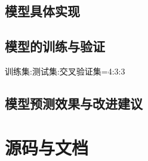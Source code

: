 \documentclass[a4paper,11pt]{ctexart}
\begin{document}
\newpage
\subsection{模型具体实现}

\newpage
\subsection{模型的训练与验证}
训练集:测试集:交叉验证集=4:3:3

\newpage
\subsection{模型预测效果与改进建议}

\newpage

\section{源码与文档}
\end{document}
